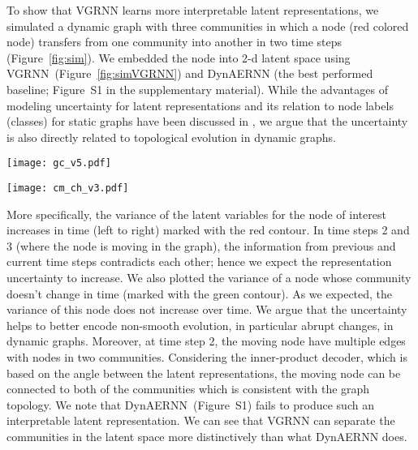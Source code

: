 \documentclass{article}
\begin{document}
{To show that VGRNN learns more interpretable latent representations, we simulated a dynamic graph with three communities in which a node (red colored node) transfers from one community into another in two time steps (Figure~\ref{fig:sim}). We embedded the node into 2-d latent space using VGRNN~(Figure~\ref{fig:simVGRNN}) and DynAERNN (the best performed baseline; Figure~S1 in the supplementary material). While the advantages of modeling uncertainty for latent representations and its relation to node labels (classes) for static graphs have been discussed in \citeauthor{bojchevski2018deep} \cite{bojchevski2018deep}, we argue that the uncertainty is also directly related to 
topological evolution 
in dynamic graphs.

\begin{figure*}[!t]
\centering
    \texttt{[image: gc\_v5.pdf]}
    \caption{\small Evolution of simulated graph topology through time.}\label{fig:sim}
\vspace{-0.1in}
\end{figure*}

\begin{figure*}[!t]
    \centering
    \texttt{[image: cm\_ch\_v3.pdf]}
    \caption{\small Latent representations of the simulated graph in different time steps in 2-d space using VGRNN.}\label{fig:simVGRNN}
\vspace{-0.2in}
\end{figure*}

More specifically, the variance of the latent variables for the node of interest increases in time (left to right) marked with the red contour. In time steps 2 and 3 (where the node is moving in the graph), the information from previous and current time steps contradicts each other; hence we expect the representation uncertainty to increase. We also plotted the variance of a node whose community doesn't change in time (marked with the green contour). As we expected, the variance of this node does not increase over time.  
We argue that the uncertainty helps to better encode non-smooth evolution, in particular abrupt changes, in dynamic graphs. 
Moreover, at time step 2, the moving node have multiple edges with nodes in two communities. Considering the inner-product decoder, which is based on the angle between the latent representations, the moving node can be connected to both of the communities which is consistent with the graph topology. 
We note that DynAERNN~(Figure~S1) fails to produce such an interpretable latent representation. We can see that VGRNN can separate the communities in the latent space more distinctively than what DynAERNN does.}
\end{document}
